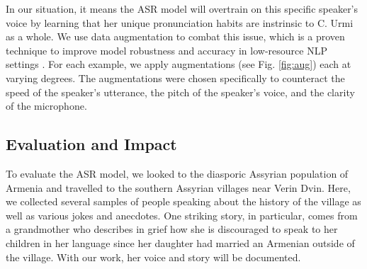 \documentclass[letterpaper]{article} %
\begin{document}
\begin{table}[t]
    \centering
    \caption{Transcribing 8 unique speech samples with and without ASR at varying lengths.}
    \label{table:results}
\end{table}

In our situation, it means the ASR model will overtrain on this specific speaker's voice by learning that her unique pronunciation habits are instrinsic to C. Urmi as a whole. We use data augmentation to combat this issue, which is a proven technique to improve model robustness and accuracy in low-resource NLP settings \cite{feng2021}. For each example, we apply augmentations (see Fig. \ref{fig:aug}) each at varying degrees. The augmentations were chosen specifically to counteract the speed of the speaker's utterance, the pitch of the speaker's voice, and the clarity of the microphone.

\subsection{Evaluation and Impact}

To evaluate the ASR model, we looked to the diasporic Assyrian population of Armenia and travelled to the southern Assyrian villages near Verin Dvin. Here, we collected several samples of people speaking about the history of the village as well as various jokes and anecdotes. One striking story, in particular, comes from a grandmother who describes in grief how she is discouraged to speak to her children in her language since her daughter had married an Armenian outside of the village. With our work, her voice and story will be documented.
\end{document}
